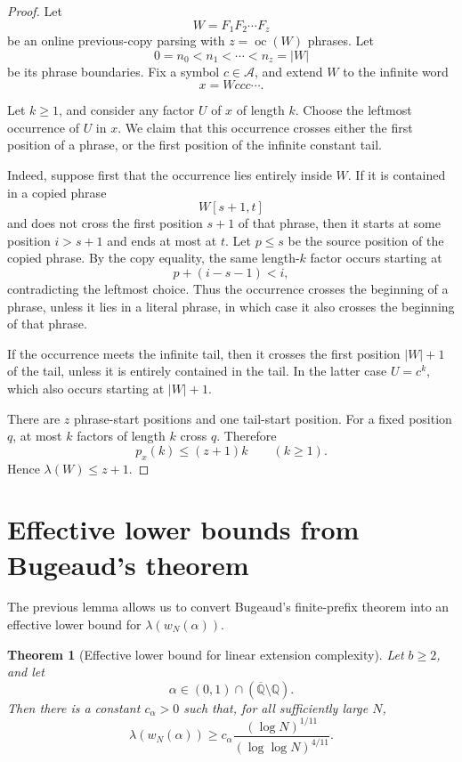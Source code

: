 \documentclass[11pt]{amsart}
\newtheorem{theorem}{Theorem}[section]
\theoremstyle{definition}
\DeclareMathOperator{\oc}{oc}
\begin{document}
\begin{proof}
Let
\[
W=F_1F_2\cdots F_z
\]
be an online previous-copy parsing with \(z=\oc(W)\) phrases. Let
\[
0=n_0<n_1<\cdots<n_z=|W|
\]
be its phrase boundaries. Fix a symbol \(c\in\mathcal A\), and extend \(W\) to the infinite word
\[
x=Wccc\cdots.
\]

Let \(k\geq 1\), and consider any factor \(U\) of \(x\) of length \(k\). Choose the leftmost occurrence of \(U\) in \(x\). We claim that this occurrence crosses either the first position of a phrase, or the first position of the infinite constant tail.

Indeed, suppose first that the occurrence lies entirely inside \(W\). If it is contained in a copied phrase
\[
W[s+1,t]
\]
and does not cross the first position \(s+1\) of that phrase, then it starts at some position \(i>s+1\) and ends at most at \(t\). Let \(p\leq s\) be the source position of the copied phrase. By the copy equality, the same length-\(k\) factor occurs starting at
\[
p+(i-s-1)<i,
\]
contradicting the leftmost choice. Thus the occurrence crosses the beginning of a phrase, unless it lies in a literal phrase, in which case it also crosses the beginning of that phrase.

If the occurrence meets the infinite tail, then it crosses the first position \(|W|+1\) of the tail, unless it is entirely contained in the tail. In the latter case \(U=c^k\), which also occurs starting at \(|W|+1\).

There are \(z\) phrase-start positions and one tail-start position. For a fixed position \(q\), at most \(k\) factors of length \(k\) cross \(q\). Therefore
\[
p_x(k)\leq (z+1)k
\qquad(k\geq 1).
\]
Hence \(\lambda(W)\leq z+1\).
\end{proof}

\section{Effective lower bounds from Bugeaud's theorem}

The previous lemma allows us to convert Bugeaud's finite-prefix theorem into an effective lower bound for \(\lambda(w_N(\alpha))\).

\begin{theorem}[Effective lower bound for linear extension complexity]
Let \(b\geq 2\), and let
\[
\alpha\in(0,1)\cap(\overline{\mathbb Q}\setminus\mathbb Q).
\]
Then there is a constant \(c_\alpha>0\) such that, for all sufficiently large \(N\),
\[
\lambda(w_N(\alpha))
\geq
c_\alpha
\frac{(\log N)^{1/11}}{(\log\log N)^{4/11}}.
\]
\end{theorem}
\end{document}

